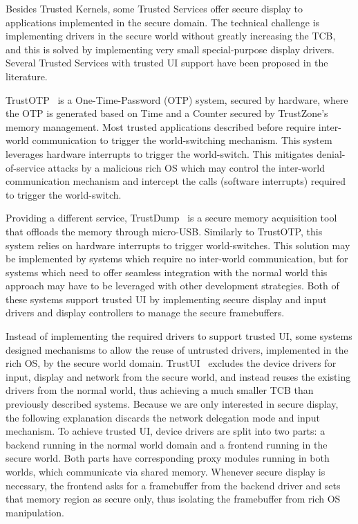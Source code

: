 Besides Trusted Kernels, some Trusted Services offer secure display to applications implemented in the secure domain. The technical challenge is implementing drivers in the secure world without greatly increasing the TCB, and this is solved by implementing very small special-purpose display drivers. Several Trusted Services with trusted UI support have been proposed in the literature.

TrustOTP~\cite{sun2015trustotp} is a One-Time-Password (OTP) system, secured by hardware, where the OTP is generated based on Time and a Counter secured by TrustZone's memory management. Most trusted applications described before require inter-world communication to trigger the world-switching mechanism. This system leverages hardware interrupts to trigger the world-switch. This mitigates denial-of-service attacks by a malicious rich OS which may control the inter-world communication mechanism and intercept the calls (software interrupts) required to trigger the world-switch. 

Providing a different service, TrustDump~\cite{sun2015reliable} is a secure memory acquisition tool that offloads the memory through micro-USB. Similarly to TrustOTP, this system relies on hardware interrupts to trigger world-switches. This solution may be implemented by systems which require no inter-world communication, but for systems which need to offer seamless integration with the normal world this approach may have to be leveraged with other development strategies. Both of these systems support trusted UI by implementing secure display and input drivers and display controllers to manage the secure framebuffers.

Instead of implementing the required drivers to support trusted UI, some systems designed mechanisms to allow the reuse of untrusted drivers, implemented in the rich OS, by the secure world domain. TrustUI~\cite{li2014building} excludes the device drivers for input, display and network from the secure world, and instead reuses the existing drivers from the normal world, thus achieving a much smaller TCB than previously described systems. Because we are only interested in secure display, the following explanation discards the network delegation mode and input mechanism. To achieve trusted UI, device drivers are split into two parts: a backend running in the normal world domain and a frontend running in the secure world. Both parts have corresponding proxy modules running in both worlds, which communicate via shared memory. Whenever secure display is necessary, the frontend asks for a framebuffer from the backend driver and sets that memory region as secure only, thus isolating the framebuffer from rich OS manipulation. 

